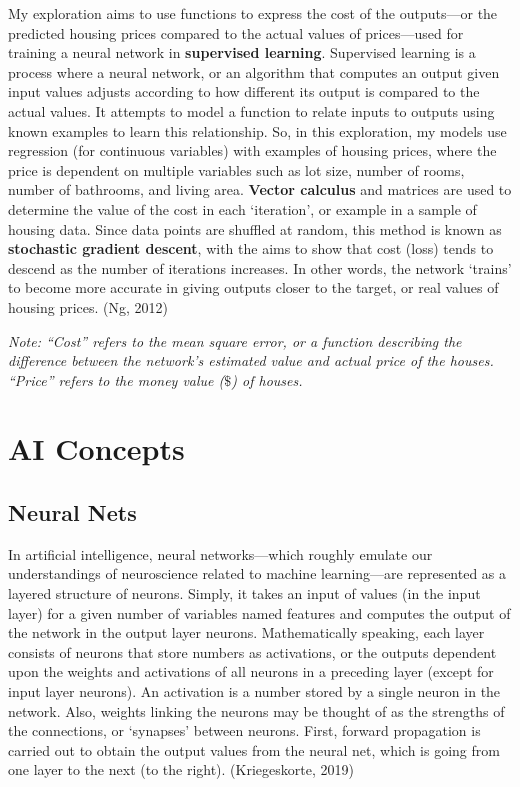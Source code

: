 \documentclass[12pt,a4paper]{article}
\begin{document}
My exploration aims to use functions to express the cost of the outputs—or the predicted housing prices compared to the actual values of prices—used for training a neural network in \textbf{supervised learning}. Supervised learning is a process where a neural network, or an algorithm that computes an output given input values adjusts according to how different its output is compared to the actual values. It attempts to model a function to relate inputs to outputs using known examples to learn this relationship. So, in this exploration, my models use regression (for continuous variables) with examples of housing prices, where the price is dependent on multiple variables such as lot size, number of rooms, number of bathrooms, and living area. \textbf{Vector calculus} and matrices are used to determine the value of the cost in each ‘iteration’, or example in a sample of housing data. Since data points are shuffled at random, this method is known as \textbf{stochastic gradient descent}, with the aims to show that cost (loss) tends to descend as the number of iterations increases. In other words, the network ‘trains’ to become more accurate in giving outputs closer to the target, or real values of housing prices. (Ng, 2012)

\textit{Note: “Cost” refers to the mean square error, or a function describing the difference between the network’s estimated value and actual price of the houses. “Price” refers to the money value ($\$$) of houses.
}


\section{AI Concepts}

\subsection{Neural Nets}

In artificial intelligence, neural networks—which roughly emulate our understandings of neuroscience related to machine learning—are represented as a layered structure of neurons. Simply, it takes an input of values (in the input layer) for a given number of variables named features and computes the output of the network in the output layer neurons. Mathematically speaking, each layer consists of neurons that store numbers as activations, or the outputs dependent upon the weights and activations of all neurons in a preceding layer (except for input layer neurons).  An activation is a number stored by a single neuron in the network. Also, weights linking the neurons may be thought of as the strengths of the connections, or ‘synapses’ between neurons. First, forward propagation is carried out to obtain the output values from the neural net, which is going from one layer to the next (to the right). (Kriegeskorte, 2019)
\end{document}
